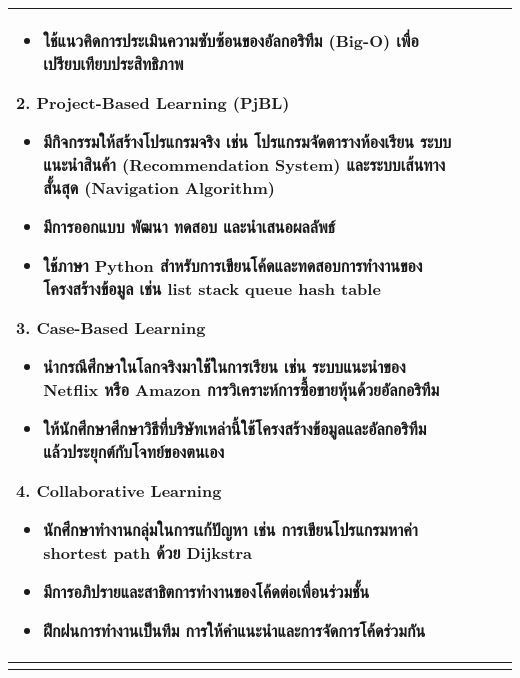 {\begin{center}
\begin{longtable}{|p{}|p{}|p{}|>{\raggedcolumns}p{}|}
\begin{itemize}
		\item ใช้แนวคิดการประเมินความซับซ้อนของอัลกอริทึม (Big-O) เพื่อเปรียบเทียบประสิทธิภาพ
	\end{itemize}
	2. Project-Based Learning (PjBL)
	\begin{itemize}
		\item มีกิจกรรมให้สร้างโปรแกรมจริง เช่น โปรแกรมจัดตารางห้องเรียน 	ระบบแนะนำสินค้า (Recommendation System)	และระบบเส้นทางสั้นสุด (Navigation Algorithm)
		\item มีการออกแบบ พัฒนา ทดสอบ และนำเสนอผลลัพธ์
		\item ใช้ภาษา Python สำหรับการเขียนโค้ดและทดสอบการทำงานของโครงสร้างข้อมูล เช่น list stack queue hash table
	\end{itemize}
	3. Case-Based Learning
	\begin{itemize}
		\item นำกรณีศึกษาในโลกจริงมาใช้ในการเรียน เช่น ระบบแนะนำของ Netflix หรือ Amazon การวิเคราะห์การซื้อขายหุ้นด้วยอัลกอริทึม
		\item ให้นักศึกษาศึกษาวิธีที่บริษัทเหล่านี้ใช้โครงสร้างข้อมูลและอัลกอริทึม แล้วประยุกต์กับโจทย์ของตนเอง
	\end{itemize}		
	4. Collaborative Learning
	\begin{itemize}
		\item นักศึกษาทำงานกลุ่มในการแก้ปัญหา เช่น การเขียนโปรแกรมหาค่า shortest path ด้วย Dijkstra
		\item มีการอภิปรายและสาธิตการทำงานของโค้ดต่อเพื่อนร่วมชั้น
		\item ฝึกฝนการทำงานเป็นทีม การให้คำแนะนำและการจัดการโค้ดร่วมกัน
	\end{itemize}	\\
\hline
&  & &


\end{longtable}
\end{center}}
